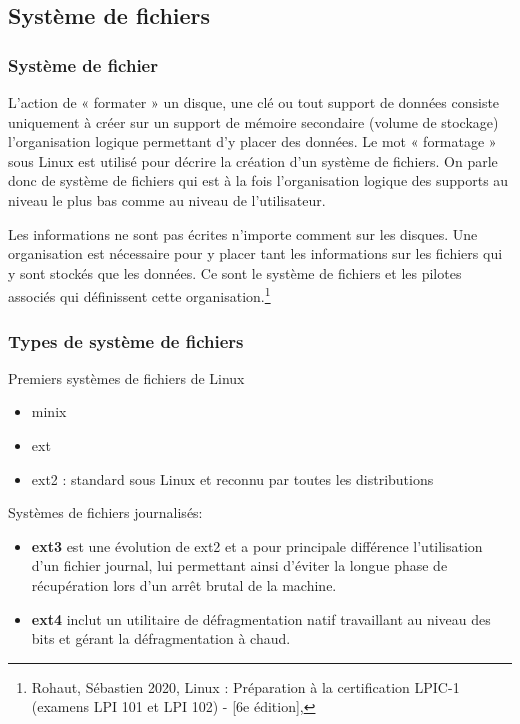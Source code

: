 	\subsection{Système de fichiers}
	\begin{frame}[containsverbatim]
		\frametitle{Système de fichier}
		L’action de « formater » un disque, une clé ou tout support de données consiste uniquement à créer sur un support de mémoire secondaire (volume de stockage) l’organisation logique permettant d’y placer des données. Le mot « formatage » sous Linux est utilisé pour décrire la création d’un système de fichiers. On parle donc de système de fichiers qui est à la fois l’organisation logique des supports au niveau le plus bas comme au niveau de l’utilisateur.
		
		Les informations ne sont pas écrites n’importe comment sur les disques. Une organisation est nécessaire pour y placer tant les informations sur les fichiers qui y sont stockés que les données. Ce sont le système de fichiers et les pilotes associés qui définissent cette organisation.\footnote{Rohaut, Sébastien 2020, Linux : {Préparation} à la certification {LPIC}-1 (examens {LPI} 101 et {LPI} 102) - [6e édition],}
	\end{frame}

	\begin{frame}[containsverbatim]
		\frametitle{Types de système de fichiers}
		Premiers systèmes de fichiers de Linux
		\begin{itemize}
			\item minix
			\item ext
			\item ext2 : standard sous Linux et reconnu par toutes les distributions
		\end{itemize}
		Systèmes de fichiers journalisés: 
		\begin{itemize}
			\item  \textbf{ext3} est une évolution de ext2 et a pour principale différence l'utilisation d'un fichier journal, lui permettant ainsi d'éviter la longue phase de récupération lors d'un arrêt brutal de la machine.
			\item \textbf{ext4} inclut un utilitaire de défragmentation natif travaillant au niveau des bits et gérant la défragmentation à chaud.
		\end{itemize}
	\end{frame}


